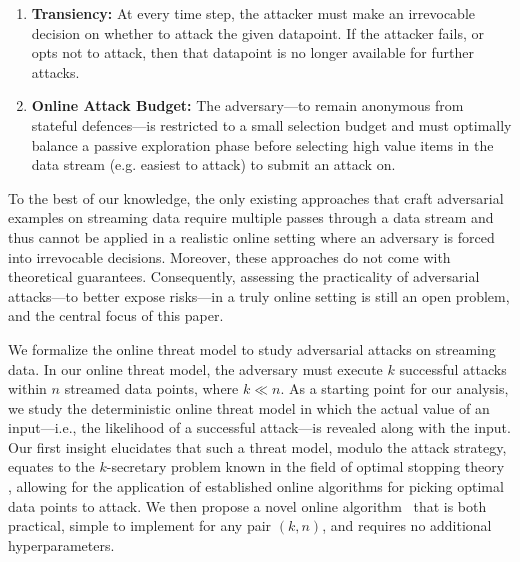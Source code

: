 \begin{enumerate}[noitemsep,topsep=0pt,parsep=0pt,partopsep=0pt, leftmargin=*] 
    \item \textbf{Transiency:} At every time step, the attacker must make an irrevocable decision on whether to attack the given datapoint. If the attacker fails, or opts not to attack, then that datapoint is no longer available for further attacks.
    \item \textbf{Online Attack Budget:} The adversary---to remain anonymous from stateful defences---is restricted to a small selection budget and must optimally balance a passive exploration phase before selecting high value items in the data stream (e.g. easiest to attack) to submit an attack on.
\end{enumerate}

To the best of our knowledge, the only existing approaches that craft adversarial examples on streaming data \citep{gong2019real,lin2017tactics,sun2020stealthy} require multiple passes through a data stream and thus cannot be applied in a realistic online setting where an adversary is forced into irrevocable decisions. Moreover, these approaches do not come with theoretical guarantees. Consequently, assessing the practicality of adversarial attacks---to better expose risks---in a truly online setting is still an open problem, and the central focus of this paper. %


We formalize the online threat model to study adversarial attacks on streaming data. In our online threat model, the adversary must execute $k$ successful attacks within $n$  streamed data points, where $k \ll n$. As a starting point for our analysis, we study the deterministic online threat model in which the actual value of an input---i.e., the likelihood of a successful attack---is revealed along with the input. Our first insight elucidates that such a threat model, modulo the attack strategy, equates to the $k$-secretary problem known in the field of optimal stopping theory \cite{dynkin1963optimum,kleinberg2005multiple}, allowing for the application of established online algorithms for picking optimal data points to attack. We then propose a novel online algorithm \algoname\ that is both practical, simple to implement for any pair $(k,n)$, and requires no additional hyperparameters.%
 

